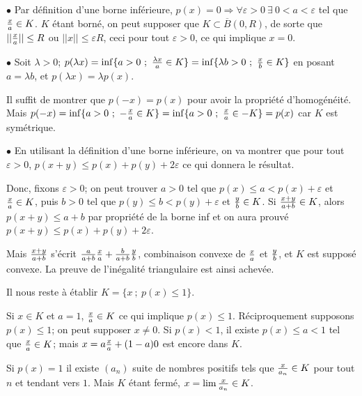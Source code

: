 {\begin{enumerate}
{$\bullet$ Par définition d'une borne inférieure, $p(x)=0\Longrightarrow
\forall\varepsilon>0 \ \exists\ 0<a< \varepsilon$ tel que ${x\over a}\in K$. $K$
étant borné, on peut supposer que $K\subset \overline B(0,R)$, de sorte que
$||{x\over a}||\leq R$ ou $||x||\leq \varepsilon R$, ceci pour tout
$\varepsilon>0$, ce qui implique $x=0$.

\smallskip 
 
$\bullet$ Soit $\lambda>0$; $p(\lambda x)=
\inf\{a>0\ ;\ {\lambda x\over a}\in K\}=\inf\{\lambda b>0\ ;\ {x\over
b}\in K\}$ en posant $a=\lambda b$, et $p(\lambda x)=\lambda p(x)$.

Il suffit de montrer que $p(- x)=p(x)$ pour avoir la propriété d'homogénéité.
Mais 
$p(- x)=\inf\{a>0\ ;\ -{ x\over a}\in K\}=\inf\{a>0\ ;\ { x\over a}\in
-K\}=p(x)$ car $K$ est symétrique.

\smallskip

$\bullet$ En utilisant la définition d'une borne inférieure, on va montrer que
pour tout
$\varepsilon>0$,
$p(x+y)\leq p(x)+p(y)+2\varepsilon$ ce qui donnera le résultat.

Donc, fixons $\varepsilon>0$; on peut trouver $a>0$ tel que $p(x)\leq
a<p(x)+\varepsilon$ et ${ x\over a}\in K$, puis $b>0$ tel que $p(y)\leq
b<p(y)+\varepsilon$ et ${y\over b}\in K$. Si ${ x+y\over a+b}\in K$, alors
$p(x+y)\leq a+b$ par propriété de la borne inf et on aura prouvé $p(x+y)\leq
p(x)+p(y)+2\varepsilon$.

Mais ${ x+y\over a+b}$ s'écrit ${ a\over a+b}{x\over a}+{
b\over a+b}{y\over b}$,  combinaison convexe de ${ x\over a}$ et ${ y\over b}$,
et $K$ est supposé convexe. La preuve de l'inégalité triangulaire est ainsi
achevée.

\smallskip

Il nous reste à établir $K=\{x\ ;\ p(x)\leq 1\}$. 

Si $x\in K$ et $a=1$, ${ x\over
a}\in K$ ce qui implique $p(x)\leq 1$. 
 Réciproquement supposons $ p(x)\leq 1$;
on peut supposer $x\not=0$. Si $p(x)<1$, il existe $p(x)\leq a<1$ tel que
${x\over a}\in K$; mais $x=a{x\over a}+(1-a)0$ est encore dans $K$.

Si $p(x)=1$ il existe $(a_n)$ suite de nombres positifs tels
que 
${x\over a_n}\in K$ pour tout $n$ et tendant vers $1$.  Mais $K$ étant fermé,
$x=\lim{x\over a_n}\in K$.}
\end{enumerate}
}